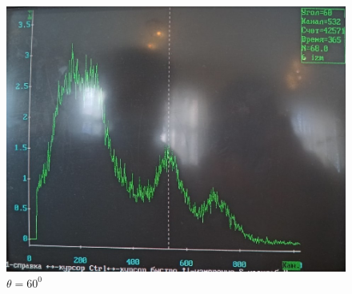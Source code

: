 \documentclass[a4paper, 12pt]{article}%
\begin{document}
\begin{figure}[h]
\begin{minipage}[h]{0.3\linewidth}
\includegraphics[width = 1\linewidth]{9.jpg}
\caption{$\theta = 60^0$}
\end{minipage}
\end{figure}
\end{document}

